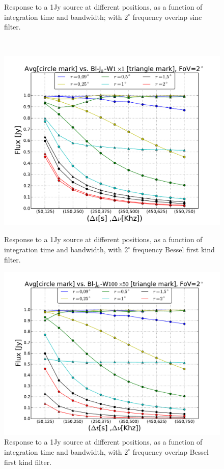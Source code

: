 \documentclass[useAMS,usenatbib]{mn2e}
\begin{document}
\begin{figure}
\begin{minipage}{0.36\linewidth}
    \caption{Response to a 1Jy source at different positions, as a function of integration time and bandwidth; with $2^{\circ}$ frequency 
 overlap sinc filter.}
    \label{fig:max-integ-timefreq-sinc-w100x50-fov2}\end{minipage}\\
\begin{minipage}{0.36\linewidth}\includegraphics[width=1\textwidth]{./Figures/max-integ-timefreq-bessel-w1x1-fov2.pdf}
      \caption{Response to a 1Jy source at different positions, as a function of integration time and bandwidth, with $2^{\circ}$ frequency 
Bessel first kind filter.}
      \label{fig:max-integ-timefreq-bessel-w1x1-fov2}\end{minipage}
\hspace{1cm}
\begin{minipage}{0.36\linewidth}\includegraphics[width=1\textwidth]{./Figures/max-integ-timefreq-bessel-w100x50-fov2.pdf}
      \caption{Response to a 1Jy source at different positions, as a function of integration time and bandwidth, with $2^{\circ}$ frequency 
overlap Bessel first kind filter.}
  \label{fig:max-integ-timefreq-bessel-w100x50-fov2}\end{minipage}
\end{figure}
\end{document}
